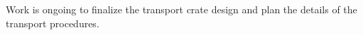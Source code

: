 Work is ongoing to finalize the transport crate design and plan the details of the transport procedures.

\begin{comment}
The spring system is shown in Fig.~\ref{fig:apa-transport-springs}. It comprises of two vertical struts with 3 springs per pair. The `wire rope' springs are Cavoflex and are manufactured by Vibrostop. Vibrostop will perform the relevant calculations based on input data such as methods of travel (by road or by sea) and lifting operations when loading onto a trailer or being manipulated down the shaft at \surf.

\begin{dunefigure}[\dword{apa} transport frame spring system]{fig:apa-transport-springs}
{Transport frame designed to transport two \dword{apa}s between production sites and the \dword{itf} and \surf.}  
\texttt{[image: sp-apa-transport-spring.png]} \qquad
\texttt{[image: sp-apa-transport-detail.png]} 
\end{dunefigure}
\end{comment}






